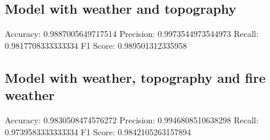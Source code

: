 \subsection{Model with weather and topography}

Accuracy: 0.9887005649717514
Precision: 0.9973544973544973
Recall: 0.9817708333333334
F1 Score: 0.989501312335958

\subsection{Model with weather, topography and fire weather}

Accuracy: 0.9830508474576272
Precision: 0.9946808510638298
Recall: 0.9739583333333334
F1 Score: 0.9842105263157894






